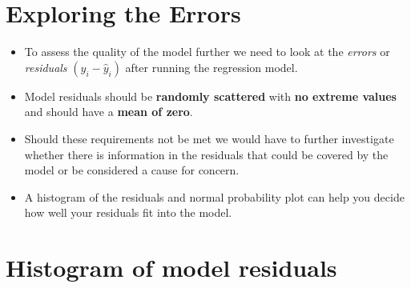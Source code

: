 \documentclass[
]{article}
\newenvironment{Shaded}{\begin{snugshade}}{\end{snugshade}}
\newcommand{\AttributeTok}[1]{\textcolor[rgb]{0.13,0.29,0.53}{#1}}
\newcommand{\CommentTok}[1]{\textcolor[rgb]{0.56,0.35,0.01}{\textit{#1}}}
\newcommand{\DecValTok}[1]{\textcolor[rgb]{0.00,0.00,0.81}{#1}}
\newcommand{\FunctionTok}[1]{\textcolor[rgb]{0.13,0.29,0.53}{\textbf{#1}}}
\newcommand{\NormalTok}[1]{#1}
\newcommand{\OtherTok}[1]{\textcolor[rgb]{0.56,0.35,0.01}{#1}}
\newcommand{\SpecialCharTok}[1]{\textcolor[rgb]{0.81,0.36,0.00}{\textbf{#1}}}
\newcommand{\StringTok}[1]{\textcolor[rgb]{0.31,0.60,0.02}{#1}}
\begin{document}
\hypertarget{exploring-the-errors}{%
\section{Exploring the Errors}\label{exploring-the-errors}}

\begin{itemize}
\item
  To assess the quality of the model further we need to look at the
  \emph{errors} or \emph{residuals} \((y_{i} - \hat{y}_{i})\) after
  running the regression model.
\item
  Model residuals should be \textbf{randomly scattered} with \textbf{no
  extreme values} and should have a \textbf{mean of zero}.
\item
  Should these requirements not be met we would have to further
  investigate whether there is information in the residuals that could
  be covered by the model or be considered a cause for concern.
\item
  A histogram of the residuals and normal probability plot can help you
  decide how well your residuals fit into the model.
\end{itemize}

\hypertarget{histogram-of-model-residuals}{%
\section{Histogram of model
residuals}\label{histogram-of-model-residuals}}

\begin{Shaded}
\end{Shaded}
\end{document}
